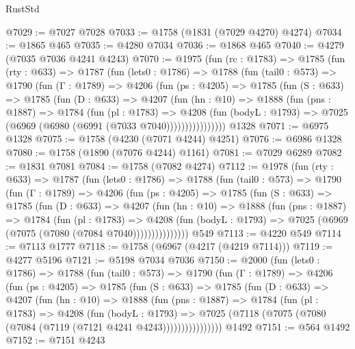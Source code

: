 \begin{lexlean}{RustStd}
\begin{coremodule}
@7029 := @7027 @7028
@7033 := @1758 (@1831 (@7029 @4270) @4274)
@7034 := @1865 @465
@7035 := @4280 @7034
@7036 := @1868 @465
@7040 := @4279 (@7035 @7036 @4241 @4243)
@7070 := @1975
    (fun (rc : @1783) =>
    @1785
      (fun (rty : @633) =>
      @1787
        (fun (lets0 : @1786) =>
        @1788
          (fun (tail0 : @573) =>
          @1790
            (fun (Γ : @1789) =>
            @4206
              (fun (ps : @4205) =>
              @1785
                (fun (S : @633) =>
                @1785
                  (fun (D : @633) =>
                  @4207
                    (fun (hn : @10) =>
                    @1888
                      (fun (pns : @1887) =>
                      @1784
                        (fun (pl : @1783) =>
                        @4208
                          (fun (bodyL : @1793) =>
                          @7025 (@6969 (@6980 (@6991 (@7033 @7040))))))))))))))))
    @1328
@7071 := @6975 @1328
@7075 := @1758 (@4230 (@7071 @4244) @4251)
@7076 := @6986 @1328
@7080 := @1758 (@1890 (@7076 @4244) @1161)
@7081 := @7029 @6289
@7082 := @1831 @7081
@7084 := @1758 (@7082 @4274)
@7112 := @1978
    (fun (rty : @633) =>
    @1787
      (fun (lets0 : @1786) =>
      @1788
        (fun (tail0 : @573) =>
        @1790
          (fun (Γ : @1789) =>
          @4206
            (fun (ps : @4205) =>
            @1785
              (fun (S : @633) =>
              @1785
                (fun (D : @633) =>
                @4207
                  (fun (hn : @10) =>
                  @1888
                    (fun (pns : @1887) =>
                    @1784
                      (fun (pl : @1783) =>
                      @4208
                        (fun (bodyL : @1793) =>
                        @7025 (@6969 (@7075 (@7080 (@7084 @7040)))))))))))))))
    @549
@7113 := @4220 @549
@7114 := @7113 @1777
@7118 := @1758 (@6967 (@4217 (@4219 @7114)))
@7119 := @4277 @5196
@7121 := @5198 @7034 @7036
@7150 := @2000
    (fun (lets0 : @1786) =>
    @1788
      (fun (tail0 : @573) =>
      @1790
        (fun (Γ : @1789) =>
        @4206
          (fun (ps : @4205) =>
          @1785
            (fun (S : @633) =>
            @1785
              (fun (D : @633) =>
              @4207
                (fun (hn : @10) =>
                @1888
                  (fun (pns : @1887) =>
                  @1784
                    (fun (pl : @1783) =>
                    @4208
                      (fun (bodyL : @1793) =>
                      @7025 (@7118 (@7075 (@7080 (@7084 (@7119 (@7121 @4241 @4243))))))))))))))))
    @1492
@7151 := @564 @1492
@7152 := @7151 @4243

\end{coremodule}
\end{lexlean}
